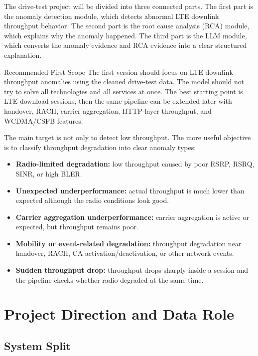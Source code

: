 \documentclass[12pt,a4paper]{article}
\begin{document}
The drive-test project will be divided into three connected parts. The first part is the anomaly detection module, which detects abnormal LTE downlink throughput behavior. The second part is the root cause analysis (RCA) module, which explains why the anomaly happened. The third part is the LLM module, which converts the anomaly evidence and RCA evidence into a clear structured explanation.

\begin{successbox}{Recommended First Scope}
The first version should focus on LTE downlink throughput anomalies using the cleaned drive-test data. The model should not try to solve all technologies and all services at once. The best starting point is LTE download sessions, then the same pipeline can be extended later with handover, RACH, carrier aggregation, HTTP-layer throughput, and WCDMA/CSFB features.
\end{successbox}

The main target is not only to detect low throughput. The more useful objective is to classify throughput degradation into clear anomaly types:

\begin{itemize}
    \item \textbf{Radio-limited degradation:} low throughput caused by poor RSRP, RSRQ, SINR, or high BLER.
    \item \textbf{Unexpected underperformance:} actual throughput is much lower than expected although the radio conditions look good.
    \item \textbf{Carrier aggregation underperformance:} carrier aggregation is active or expected, but throughput remains poor.
    \item \textbf{Mobility or event-related degradation:} throughput degradation near handover, RACH, CA activation/deactivation, or other network events.
    \item \textbf{Sudden throughput drop:} throughput drops sharply inside a session and the pipeline checks whether radio degraded at the same time.
\end{itemize}

\section{Project Direction and Data Role}

\subsection{System Split}
\end{document}

